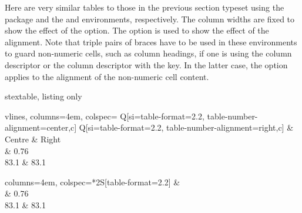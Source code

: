 Here are very similar tables to those in the previous section
typeset using the  package
and the  and  environments, respectively.
The column widths are fixed to show the effect of the  option.
The  option is used to show the effect of the alignment.
Note that triple pairs of braces have to be used in these environments
to guard non-numeric cells, such as column headings,
if one is using the  column descriptor or 
the  column descriptor with the  key.
In the latter case, the  option applies
to the alignment of the non-numeric cell content.
\begin{tcblisting}{stextable, listing only}
\begin{center}
  \begin{tblr}{
    vlines, columns={4em},
    colspec={
      Q[si={table-format=2.2, table-number-alignment=center},c]
      Q[si={table-format=2.2, table-number-alignment=right},c]
    }
  }
    \hline
     & \\
    \hline
    {{{Centre}}} & {{{Right}}} \\
     & 0.76 \\
    83.1 & 83.1 \\
    \hline
  \end{tblr}
  \quad
  \begin{booktabs}{
    columns={4em},
    colspec={*{2}{S[table-format=2.2]}}
  }
    \toprule
     & \\
     & 0.76 \\
    83.1 & 83.1 \\
    \bottomrule
  \end{booktabs}
\end{center}
\end{tcblisting}


